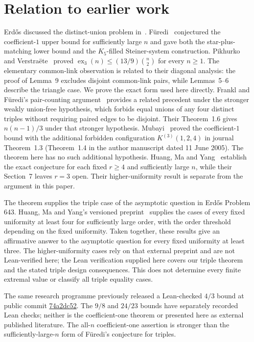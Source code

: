 \section{Relation to earlier work}
Erd\H{o}s discussed the distinct-union problem in~\cite[Section II, item 6]{erdos1977}. F\"uredi~\cite[Conjecture~1.4]{furedi} conjectured the coefficient-$1$ upper bound
for sufficiently large $n$ and gave both the star-plus-matching lower
bound and the $K_5$-filled Steiner-system construction.
Pikhurko and Verstra\"ete~\cite[Theorem~2]{pv} proved
$\operatorname{ex}_3(n)\leq(13/9)\binom n2$ for every $n\geq1$.
The elementary common-link observation is related to their diagonal analysis: the proof of Lemma~9 excludes disjoint common-link pairs, while Lemmas~5--6 describe the triangle case. We prove the exact form used here directly.
Frankl and F\"uredi's pair-counting argument~\cite[Section~2]{ff}
provides a related precedent under the stronger weakly union-free hypothesis, which forbids equal unions of any four distinct triples without requiring paired edges to be disjoint. Their Theorem~1.6 gives $n(n-1)/3$ under that stronger hypothesis.
Mubayi~\cite{mubayi} proved the coefficient-$1$ bound with the additional
forbidden configuration $K^{(3)}(1,2,4)$ in journal Theorem~1.3 (Theorem~1.4 in the author manuscript dated 11 June 2005).
The theorem here has no such additional hypothesis.
Huang, Ma and Yang~\cite[Theorem~1.2]{hmy} establish the exact conjecture
for each fixed $r\geq4$ and sufficiently large $n$, while their
Section~7 leaves $r=3$ open. Their higher-uniformity result is separate
from the argument in this paper.

The theorem supplies the triple case of the asymptotic question in Erd\H{o}s Problem 643. Huang, Ma and Yang's versioned preprint~\cite[Theorem~1.2]{hmy} supplies the cases of every fixed uniformity at least four for sufficiently large order, with the order threshold depending on the fixed uniformity. Taken together, these results give an affirmative answer to the asymptotic question for every fixed uniformity at least three. The higher-uniformity cases rely on that external preprint and are not Lean-verified here; the Lean verification supplied here covers our triple theorem and the stated triple design consequences. This does not determine every finite extremal value or classify all triple equality cases.

The same research programme previously released a Lean-checked $4/3$ bound at public commit \href{https://github.com/roberthuynh/erdos/commit/74a2dc52}{74a2dc52}. The $9/8$ and $24/23$ bounds have separately recorded Lean checks; neither is the coefficient-one theorem or presented here as external published literature. The all-$n$ coefficient-one assertion is stronger than the sufficiently-large-$n$ form of F\"uredi's conjecture for triples.

